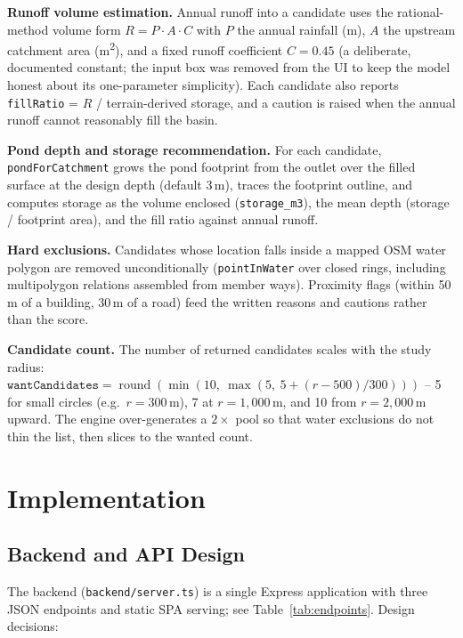 \documentclass[manuscript,screen,review]{acmart}
\begin{document}
\textbf{Runoff volume estimation.} Annual runoff into a candidate uses the
rational-method volume form
$R = P \cdot A \cdot C$ with $P$ the annual rainfall (m), $A$ the upstream
catchment area (m\textsuperscript{2}), and a fixed runoff coefficient
$C = 0.45$ (a deliberate, documented constant; the input box was removed from
the UI to keep the model honest about its one-parameter simplicity). Each
candidate also reports \texttt{fillRatio} = $R$ / terrain-derived storage, and
a caution is raised when the annual runoff cannot reasonably fill the basin.

\textbf{Pond depth and storage recommendation.} For each candidate,
\texttt{pondForCatchment} grows the pond footprint from the outlet over the
filled surface at the design depth (default 3\,m), traces the footprint
outline, and computes storage as the volume enclosed
(\texttt{storage\_m3}), the mean depth (storage / footprint area), and the
fill ratio against annual runoff.

\textbf{Hard exclusions.} Candidates whose location falls inside a mapped OSM
water polygon are removed unconditionally (\texttt{pointInWater} over closed
rings, including multipolygon relations assembled from member ways).
Proximity flags (within 50\,m of a building, 30\,m of a road) feed the
written reasons and cautions rather than the score.

\textbf{Candidate count.} The number of returned candidates scales with the
study radius:
$\texttt{wantCandidates} = \operatorname{round}(\min(10,\ \max(5,\ 5 + (r - 500)/300)))$
-- 5 for small circles (e.g.\ $r=300$\,m), 7 at $r=1{,}000$\,m, and 10 from
$r=2{,}000$\,m upward. The engine over-generates a $2\times$ pool so that
water exclusions do not thin the list, then slices to the wanted count.

\section{Implementation}
\label{sec:implementation}

\subsection{Backend and API Design}
The backend (\texttt{backend/server.ts}) is a single Express application
with three JSON endpoints and static SPA serving; see
Table~\ref{tab:endpoints}. Design decisions:
\end{document}
